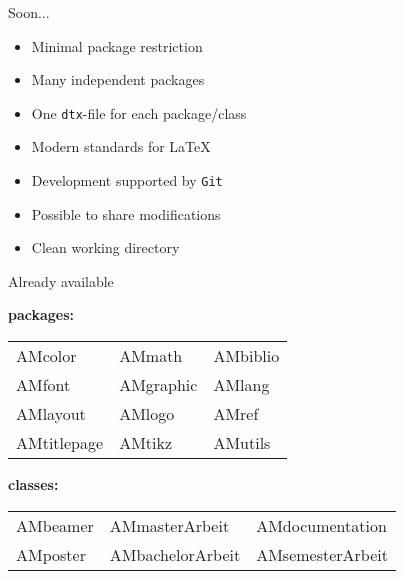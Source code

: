 \documentclass[handout]{AMbeamer}
\begin{document}
\begin{frame}{Soon...}

\begin{itemize}\setlength\itemsep{1.1em}
\item Minimal package restriction
\item Many independent packages 
\item One \texttt{dtx}-file for each package/class
\item Modern standards for \LaTeX
\item Development supported by \texttt{Git}
\item Possible to share modifications
\item Clean working directory
\end{itemize}

\end{frame}

\begin{frame}{Already available}

\textbf{packages:}
\medskip
\begin{tcolorbox}[colframe=TUMBlue,colback=white]
\centering
\begin{tabular}{p{3cm}p{3cm}p{3cm}}
AMcolor & AMmath & AMbiblio \\[1ex]
AMfont & AMgraphic & AMlang \\[1ex]
AMlayout & AMlogo & AMref \\[1ex]
AMtitlepage & AMtikz & AMutils \\
\end{tabular}
\end{tcolorbox}

\smallskip
\textbf{classes:}
\medskip
\begin{tcolorbox}[colframe=TUMBlue,colback=white]
\centering
\begin{tabular}{p{2cm}p{3cm}p{3cm}}
AMbeamer & AMmasterArbeit & AMdocumentation \\
AMposter & AMbachelorArbeit & AMsemesterArbeit \\
\end{tabular}
\end{tcolorbox}

\end{frame}
\end{document}

